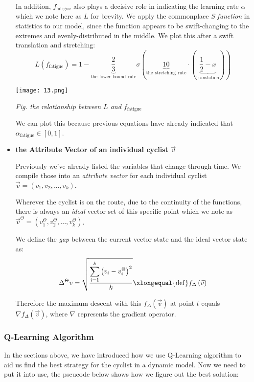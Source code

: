 \documentclass[14pt]{article}
\theoremstyle{definition}
\theoremstyle{remark}
\numberwithin{equation}{section}
\begin{document}
\begin{itemize}
				In addition, \(f_{\mathrm{fatigue}}\) also plays a decisive role in indicating the learning rate \(\alpha\) which we note here as \(L\) for brevity. We apply the commonplace \textit{S function} in statistics to our model, since the function appears to be swift-changing to the extremes and evenly-distributed in the middle. We plot this after a swift translation and stretching:
				\[L\left( f_{\mathrm{fatigue}} \right) =1-\underset{\mathrm{the}\:\:\mathrm{lower}\:\:\mathrm{bound}\:\:\mathrm{rate}}{\underbrace{\dfrac{2}{3}}}\sigma \left( \underset{\mathrm{the}\:\:\mathrm{stretching}\:\:\mathrm{rate}}{\underbrace{10}}\cdot \left( \underset{\mathrm{translation}}{\underbrace{\dfrac{1}{2}-x}} \right) \right) \]
				\begin{center}
					\texttt{[image: 13.png]}

					\small \textit{Fig. the relationship between $L$ and $f_\mathrm{fatigue}$}
				\end{center}
				We can plot this because previous equations have already indicated that \(\alpha _{\mathrm{fatigue}}\in \left[ 0,1 \right] \).
			\item \textbf{the Attribute Vector of an individual cyclist \(\vec{v}\)}

				Previously we've already listed the variables that change through time. We compile those into an \textit{attribute vector} for each individual cyclist \(\vec{v}=\left( v_1,v_2,...,v_k \right) \).

				Wherever the cyclist is on the route, due to the continuity of the functions, there is always an \textit{ideal} vector set of this specific point which we note as \(\vec{v}^{\Theta}=\left( v_{1}^{\Theta},v_{2}^{\Theta},...,v_{k}^{\Theta} \right)\).

				We define the \textit{gap} between the current vector state and the ideal vector state as:
				\[\Delta ^{\Theta}v=\sqrt{\dfrac{\displaystyle\sum\limits_{i=1}^k{\left( v_i-v_{i}^{\Theta} \right) ^2}}{k}}\xlongequal{\mathrm{def}}f_{\Delta}\left( \vec{v} \right) \]

				Therefore the maximum descent with this \(f_{\Delta}\left( \vec{v} \right)\) at point \(t\) equals $\nabla f_{\Delta}\left( \vec{v} \right)$, where \(\nabla\) represents the gradient operator.
		\end{itemize}
	\subsubsection{Q-Learning Algorithm}
	In the sections above, we have introduced how we use Q-Learning algorithm to aid us find the best strategy for the cyclist in a dynamic model. Now we need to put it into use, the pseucode below shows how we figure out the best solution:
\end{document}
